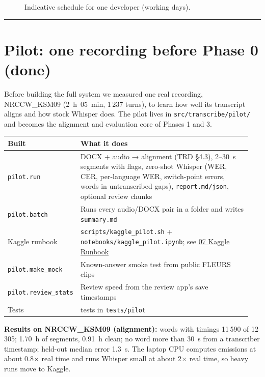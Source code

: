 \documentclass[11pt]{article}
\begin{document}
\begin{figure}[!htbp]\centering
\resizebox{\ifdim\width>\linewidth\linewidth\else\width\fi}{!}{}
\caption{Indicative schedule for one developer (working days).}
\end{figure}

\begin{center}\rule{0.5\linewidth}{0.5pt}\end{center}

\hypertarget{pilot}{%
\section{Pilot: one recording before Phase 0 (done)}\label{pilot}}

Before building the full system we measured one real recording, NRCCW\_KSM09 (2~h~05~min, 1\,237 turns), to learn how well its transcript aligns and how stock Whisper does. The pilot lives in \texttt{src/\allowbreak{}transcribe/\allowbreak{}pilot/} and becomes the alignment and evaluation core of Phases 1 and 3.

\begin{longtable}[]{@{}>{\raggedright\arraybackslash}p{0.25\linewidth}>{\raggedright\arraybackslash}p{0.7\linewidth}@{}}
\toprule\noalign{}
Built & What it does \\
\midrule\noalign{}
\endhead
\bottomrule\noalign{}
\endlastfoot
\texttt{pilot.run} & DOCX + audio → alignment (TRD §4.3), 2--30~s segments with flags, zero-shot Whisper (WER, CER, per-language WER, switch-point errors, words in untranscribed gaps), \texttt{report.md/json}, optional review chunks \\
\texttt{pilot.batch} & Runs every audio/DOCX pair in a folder and writes \texttt{summary.md} \\
Kaggle runbook & \texttt{scripts/kaggle\_pilot.sh} + \texttt{notebooks/kaggle\_pilot.ipynb}; see \href{07_KAGGLE_RUNBOOK.pdf}{07 Kaggle Runbook} \\
\texttt{pilot.make\_mock} & Known-answer smoke test from public FLEURS clips \\
\texttt{pilot.review\_stats} & Review speed from the review app's save timestamps \\
Tests & 24 tests in \texttt{tests/pilot} \\
\end{longtable}

\textbf{Results on NRCCW\_KSM09 (alignment):} words with timings 11\,590 of 12\,305; 1.70~h of segments, 0.91~h clean; no word more than 30~s from a transcriber timestamp; held-out median error 1.3~s. The laptop CPU computes emissions at about 0.8$\times$ real time and runs Whisper small at about 2$\times$ real time, so heavy runs move to Kaggle.
\end{document}
